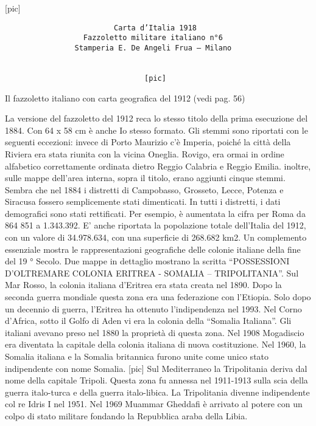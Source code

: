 {[}pic{]}

\begin{verbatim}
                         Carta d’Italia 1918
                  Fazzoletto militare italiano n°6
                Stamperia E. De Angeli Frua – Milano


                                [pic]
\end{verbatim}

Il fazzoletto italiano con carta geografica del 1912 (vedi pag. 56)

La versione del fazzoletto del 1912 reca lo stesso titolo della prima
esecuzione del 1884. Con 64 x 58 cm è anche Io stesso formato. Gli
stemmi sono riportati con le seguenti eccezioni: invece di Porto
Maurizio c'è Imperia, poiché la città della Riviera era stata riunita
con la vicina Oneglia. Rovigo, era ormai in ordine alfabetico
correttamente ordinata dietro Reggio Calabria e Reggio Emilia. inoltre,
sulle mappe dell'area interna, sopra il titolo, erano aggiunti cinque
stemmi. Sembra che nel 1884 i distretti di Campobasso, Grosseto, Lecce,
Potenza e Siracusa fossero semplicemente stati dimenticati. In tutti i
distretti, i dati demografici sono stati rettificati. Per esempio, è
aumentata la cifra per Roma da 864 851 a 1.343.392. E' anche riportata
la popolazione totale dell'Italia del 1912, con un valore di 34.978.634,
con una superficie di 268.682 km2. Un complemento essenziale mostra le
rappresentazioni geografiche delle colonie italiane della fine del 19 °
Secolo. Due mappe in dettaglio mostrano la scritta ``POSSESSIONI
D'OLTREMARE COLONIA ERITREA - SOMALIA -- TRIPOLITANIA''. Sul Mar Rosso,
la colonia italiana d'Eritrea era stata creata nel 1890. Dopo la seconda
guerra mondiale questa zona era una federazione con l'Etiopia. Solo dopo
un decennio di guerra, l'Eritrea ha ottenuto l'indipendenza nel 1993.
Nel Corno d'Africa, sotto il Golfo di Aden vi era la colonia della
``Somalia Italiana''. Gli italiani avevano preso nel 1880 la proprietà
di questa zona. Nel 1908 Mogadiscio era diventata la capitale della
colonia italiana di nuova costituzione. Nel 1960, la Somalia italiana e
la Somalia britannica furono unite come unico stato indipendente con
nome Somalia. {[}pic{]} Sul Mediterraneo la Tripolitania deriva dal nome
della capitale Tripoli. Questa zona fu annessa nel 1911-1913 sulla scia
della guerra italo-turca e della guerra italo-libica. La Tripolitania
divenne indipendente col re Idris I nel 1951. Nel 1969 Muammar Gheddafi
è arrivato al potere con un colpo di stato militare fondando la
Repubblica araba della Libia.

